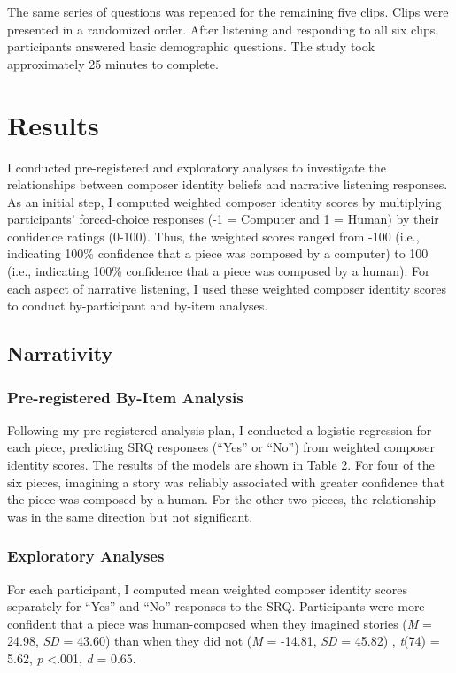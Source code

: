 \documentclass[12pt,twoside]{reedthesis}
\begin{document}
The same series of questions was repeated for the remaining five clips. Clips were presented in a randomized order. After listening and responding to all six clips, participants answered basic demographic questions. The study took approximately 25 minutes to complete. 

\section*{Results}
I conducted pre-registered and exploratory analyses to investigate the relationships between composer identity beliefs and narrative listening responses. As an initial step, I computed weighted composer identity scores by multiplying participants’ forced-choice responses (-1 = Computer and 1 = Human) by their confidence ratings (0-100). Thus, the weighted scores ranged from -100 (i.e., indicating 100\% confidence that a piece was composed by a computer) to 100 (i.e., indicating 100\% confidence that a piece was composed by a human). For each aspect of narrative listening, I used these weighted composer identity scores to conduct by-participant and by-item analyses. 

\subsection*{Narrativity}
\subsubsection*{Pre-registered By-Item Analysis}
Following my pre-registered analysis plan, I conducted a logistic regression for each piece, predicting SRQ responses (“Yes” or “No”) from weighted composer identity scores. The results of the models are shown in Table 2. For four of the six pieces, imagining a story was reliably associated with greater confidence that the piece was composed by a human. For the other two pieces, the relationship was in the same direction but not significant.

\subsubsection*{Exploratory Analyses}

For each participant, I computed mean weighted composer identity scores separately for “Yes” and “No” responses to the SRQ. Participants were more confident that a piece was human-composed when they imagined stories (\emph{M} = 24.98, \emph{SD} = 43.60) than when they did not (\emph{M} = -14.81, \emph{SD} = 45.82) , \emph{t}(74) = 5.62, \emph{p} \textless .001, \emph{d} = 0.65. 
\end{document}
